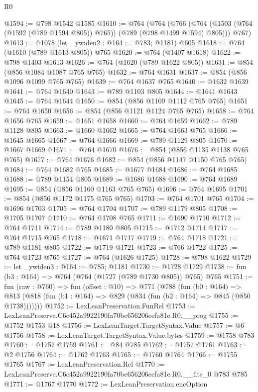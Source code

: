 \begin{lexlean}{R0}
\begin{coremodule}
@1594 := @798 @1542 @1585
@1610 := @764
    (@764
      (@766 (@764 (@1503 (@764 (@1592 (@789 @1594 @805)) @765)) (@789 (@798 @1499 @1594) @805)))
      @767)
@1613 := @1078 (let _ywiden2 : @164 := @783; @1181) @605
@1618 := @764 (@1610 (@789 @1613 @805)) @765
@1620 := @764 (@1407 @1618)
@1622 := @798 @1403 @1613
@1626 := @764 (@1620 (@789 @1622 @805))
@1631 := @854 (@856 @1084 @1087 @765 @765)
@1632 := @764 @1631
@1637 := @854 (@856 @1096 @1099 @765 @765)
@1639 := @764 @1637 @765
@1640 := @1632 @1639
@1641 := @764 @1640
@1643 := @789 @1103 @805
@1644 := @1641 @1643
@1645 := @764 @1644
@1650 := @854 (@856 @1109 @1112 @765 @765)
@1651 := @764 @1650
@1656 := @854 (@856 @1121 @1124 @765 @765)
@1658 := @764 @1656 @765
@1659 := @1651 @1658
@1660 := @764 @1659
@1662 := @789 @1128 @805
@1663 := @1660 @1662
@1665 := @764 @1663 @765
@1666 := @1645 @1665
@1667 := @764 @1666
@1669 := @789 @1129 @805
@1670 := @1667 @1669
@1671 := @764 @1670
@1676 := @854 (@856 @1135 @1138 @765 @765)
@1677 := @764 @1676
@1682 := @854 (@856 @1147 @1150 @765 @765)
@1684 := @764 @1682 @765
@1685 := @1677 @1684
@1686 := @764 @1685
@1688 := @789 @1154 @805
@1689 := @1686 @1688
@1690 := @764 @1689
@1695 := @854 (@856 @1160 @1163 @765 @765)
@1696 := @764 @1695
@1701 := @854 (@856 @1172 @1175 @765 @765)
@1703 := @764 @1701 @765
@1704 := @1696 @1703
@1705 := @764 @1704
@1707 := @789 @1179 @805
@1708 := @1705 @1707
@1710 := @764 @1708 @765
@1711 := @1690 @1710
@1712 := @764 @1711
@1714 := @789 @1180 @805
@1715 := @1712 @1714
@1717 := @764 @1715 @765
@1718 := @1671 @1717
@1719 := @764 @1718
@1721 := @789 @1181 @805
@1722 := @1719 @1721
@1723 := @766 @1722
@1725 := @764 @1723 @765
@1727 := @764 (@1626 @1725)
@1728 := @798 @1622
@1729 := let _ywiden3 : @164 := @785; @1181
@1730 := @1728 @1729
@1738 := fun (b3 : @164) => @764 (@764 (@1727 (@789 @1730 @805)) @765) @765
@1751 := fun (raw : @760) =>
  fun (offset : @10) =>
  @771
    (@788
      (fun (b0 : @164) =>
      @813 (@818 (fun (b1 : @164) => @829 (@834 (fun (b2 : @164) => @845 (@850 @1738)))))))
@1752 := LexLeanPreservation.FunRel
@1753 := LexLeanPreserve.C6c452a9922190fa70bc656206eefa81e.R0.__prog
@1755 := @1752 @1753 @18
@1756 := LexLeanTarget.TargetSyntax.Value
@1757 := @6 @1756
@1758 := LexLeanTarget.TargetSyntax.Value.bytes
@1759 := @1758 @783
@1760 := @1757 @1759
@1761 := @84 @785
@1762 := @1757 @1761
@1763 := @2 @1756
@1764 := @1762 @1763
@1765 := @1760 @1764
@1766 := @1755 @1765
@1767 := LexLeanPreservation.Rel
@1770 := LexLeanPreserve.C6c452a9922190fa70bc656206eefa81e.R0.__fits_0 @783 @785
@1771 := @1767 @1770
@1772 := LexLeanPreservation.encOption

\end{coremodule}
\end{lexlean}
